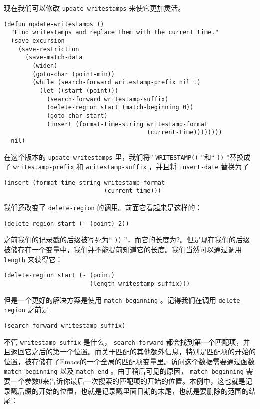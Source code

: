 现在我们可以修改 \texttt{update-writestamps} 来使它更加灵活。

\begin{verbatim}
(defun update-writestamps ()
  "Find writestamps and replace them with the current time."
  (save-excursion
    (save-restriction
      (save-match-data
        (widen)
        (goto-char (point-min))
        (while (search-forward writestamp-prefix nil t)
          (let ((start (point)))
            (search-forward writestamp-suffix)
            (delete-region start (match-beginning 0))
            (goto-char start)
            (insert (format-time-string writestamp-format
                                        (current-time))))))))
  nil)
\end{verbatim}

在这个版本的 \texttt{update-writestamps} 里，我们将” \verb|WRITESTAMP((| ”和“ \verb|))| ”替换成了 \texttt{writestamp-prefix} 和 \texttt{writestamp-suffix} ，并且将 \texttt{insert-date} 替换为了

\begin{verbatim}
(insert (format-time-string writestamp-format
                            (current-time)))
\end{verbatim}

我们还改变了 \texttt{delete-region} 的调用。前面它看起来是这样的：

\begin{verbatim}
(delete-region start (- (point) 2))
\end{verbatim}

之前我们的记录戳的后缀被写死为“ \verb|))| ”，而它的长度为2。但是现在我们的后缀被储存在一个变量中，我们并不能提前知道它的长度。我们当然可以通过调用 \texttt{length} 来获得它：

\begin{verbatim}
(delete-region start (- (point)
                        (length writestamp-suffix)))
\end{verbatim}

但是一个更好的解决方案是使用 \texttt{match-beginning} 。记得我们在调用 \texttt{delete-region} 之前是

\begin{verbatim}
(search-forward writestamp-suffix)
\end{verbatim}

不管 \texttt{writestamp-suffix} 是什么， \texttt{search-forward} 都会找到第一个匹配项，并且返回它之后的第一个位置。而关于匹配的其他额外信息，特别是匹配项的开始的位置，被存储在了Emacs的一个全局的匹配项变量里。访问这个数据需要通过函数 \texttt{match-beginning} 以及 \texttt{match-end} 。由于稍后可见的原因， \texttt{match-beginning} 需要一个参数0来告诉你最后一次搜索的匹配项的开始的位置。本例中，这也就是记录戳后缀的开始的位置，也就是记录戳里面日期的末尾，也就是要删除的范围的结尾：

